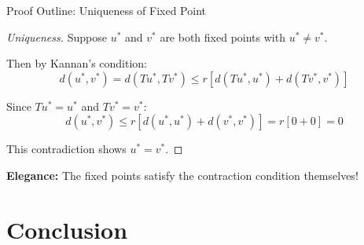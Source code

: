 \documentclass[aspectratio=169,10pt]{beamer}
\begin{document}
\begin{frame}{Proof Outline: Uniqueness of Fixed Point}
    \begin{proof}[Uniqueness]
        Suppose $u^*$ and $v^*$ are both fixed points with $u^* \neq v^*$.

        Then by Kannan's condition:
        \[
            d(u^*, v^*) = d(Tu^*, Tv^*) \leq r[d(Tu^*, u^*) + d(Tv^*, v^*)]
        \]

        Since $Tu^* = u^*$ and $Tv^* = v^*$:
        \[
            d(u^*, v^*) \leq r[d(u^*, u^*) + d(v^*, v^*)] = r[0 + 0] = 0
        \]

        This contradiction shows $u^* = v^*$.
    \end{proof}

    \vspace{0.2cm}
    \textbf{Elegance:} The fixed points satisfy the contraction condition themselves!
\end{frame}

\section{Conclusion}
\end{document}
